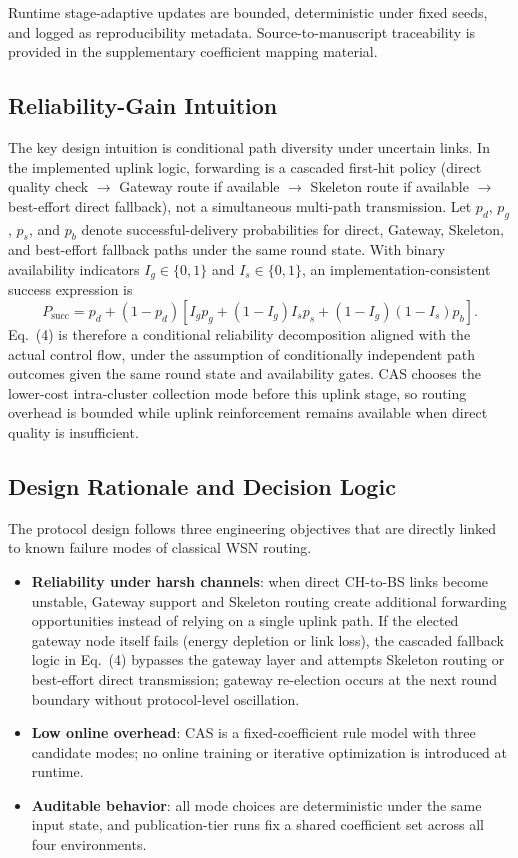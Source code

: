 ﻿\documentclass[sensors,article,submit,moreauthors,pdftex]{Definitions/mdpi}
\begin{document}
Runtime stage-adaptive updates are bounded, deterministic under fixed seeds, and logged as reproducibility metadata. Source-to-manuscript traceability is provided in the supplementary coefficient mapping material.

\subsection{Reliability-Gain Intuition}
The key design intuition is conditional path diversity under uncertain links. In the implemented uplink logic, forwarding is a cascaded first-hit policy (direct quality check \(\rightarrow\) Gateway route if available \(\rightarrow\) Skeleton route if available \(\rightarrow\) best-effort direct fallback), not a simultaneous multi-path transmission. Let \(p_d\), \(p_g\), \(p_s\), and \(p_b\) denote successful-delivery probabilities for direct, Gateway, Skeleton, and best-effort fallback paths under the same round state. With binary availability indicators \(I_g\in\{0,1\}\) and \(I_s\in\{0,1\}\), an implementation-consistent success expression is
\begin{equation}
P_{\mathrm{succ}} = p_d + (1-p_d)\left[I_g p_g + (1-I_g)I_s p_s + (1-I_g)(1-I_s)p_b\right].
\end{equation}
Eq.~(4) is therefore a conditional reliability decomposition aligned with the actual control flow, under the assumption of conditionally independent path outcomes given the same round state and availability gates. CAS chooses the lower-cost intra-cluster collection mode before this uplink stage, so routing overhead is bounded while uplink reinforcement remains available when direct quality is insufficient.

\subsection{Design Rationale and Decision Logic}
The protocol design follows three engineering objectives that are directly linked to known failure modes of classical WSN routing.
\begin{itemize}
\item \textbf{Reliability under harsh channels}: when direct CH-to-BS links become unstable, Gateway support and Skeleton routing create additional forwarding opportunities instead of relying on a single uplink path. If the elected gateway node itself fails (energy depletion or link loss), the cascaded fallback logic in Eq.~(4) bypasses the gateway layer and attempts Skeleton routing or best-effort direct transmission; gateway re-election occurs at the next round boundary without protocol-level oscillation.
\item \textbf{Low online overhead}: CAS is a fixed-coefficient rule model with three candidate modes; no online training or iterative optimization is introduced at runtime.
\item \textbf{Auditable behavior}: all mode choices are deterministic under the same input state, and publication-tier runs fix a shared coefficient set across all four environments.
\end{itemize}
\end{document}
